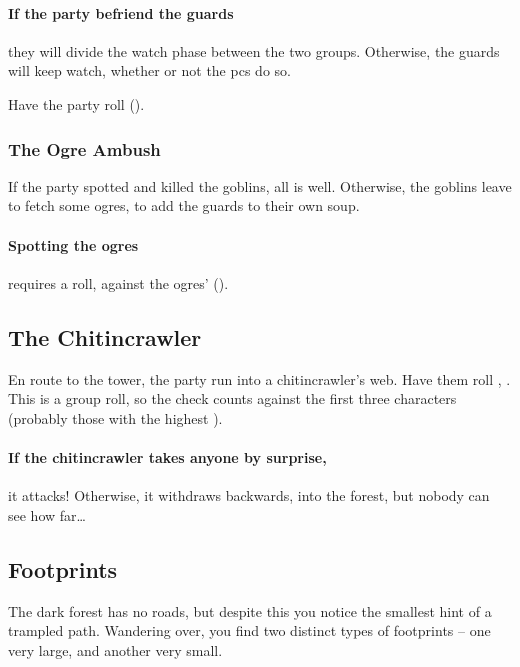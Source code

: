 \begin{multicols}{2}
\paragraph{If the party befriend the \glspl{guard}}
they will divide the watch phase between the two groups.
Otherwise, the \glspl{guard} will keep watch, whether or not the \glspl{pc} do so.

Have the party roll  (\tn[10]).

\subsubsection{The Ogre Ambush}

If the party spotted and killed the goblins, all is well.
Otherwise, the goblins leave to fetch some ogres, to add the guards to their own soup.

\randomfour

\ogre

\paragraph{Spotting the ogres}
requires a  roll, against the ogres'  (\tn).

\subsection{The Chitincrawler}

En route to the tower, the party run into a chitincrawler's web.
Have them roll , \tn[10].
This is a group roll, so the check counts against the first three characters (probably those with the highest ).

\chitincrawler

\paragraph{If the chitincrawler takes anyone by surprise,}
it attacks!
Otherwise, it withdraws backwards, into the forest, but nobody can see how far\ldots

\subsection{Footprints}

\begin{boxtext}
  The dark forest has no roads, but despite this you notice the smallest hint of a trampled path.
  Wandering over, you find two distinct types of footprints -- one very large, and another very small.
\end{boxtext}


\end{multicols}
